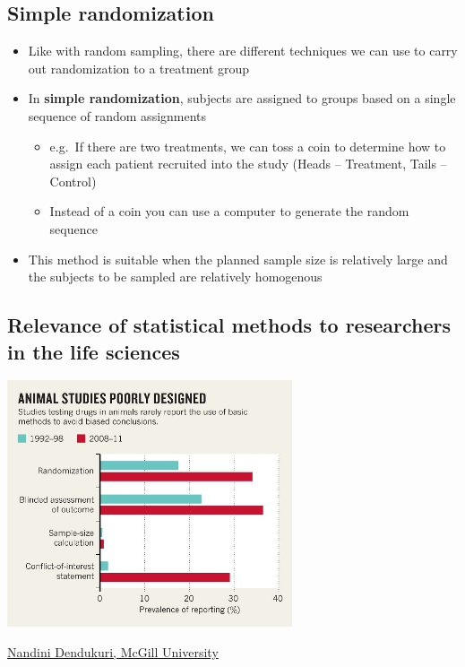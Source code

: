 \documentclass[
]{book}
\providecommand{\tightlist}{%
  \setlength{\itemsep}{0pt}\setlength{\parskip}{0pt}}
\begin{document}
\hypertarget{simple-randomization}{%
\subsection{Simple randomization}\label{simple-randomization}}

\begin{itemize}
\tightlist
\item
  Like with random sampling, there are different techniques we can use to carry out randomization to a treatment group
\item
  In \textbf{simple randomization}, subjects are assigned to groups based on a single sequence of random assignments

  \begin{itemize}
  \tightlist
  \item
    e.g.~If there are two treatments, we can toss a coin to determine how to assign each patient recruited into the study (Heads -- Treatment, Tails -- Control)
  \item
    Instead of a coin you can use a computer to generate the random sequence
  \end{itemize}
\item
  This method is suitable when the planned sample size is relatively large and the subjects to be sampled are relatively homogenous
\end{itemize}

\hypertarget{relevance-of-statistical-methods-to-researchers-in-the-life-sciences}{%
\subsection{Relevance of statistical methods to researchers in the life sciences}\label{relevance-of-statistical-methods-to-researchers-in-the-life-sciences}}

\includegraphics[width=0.5\linewidth]{./1_53}

\href{https://www.nature.com/news/poorly-designed-animal-experiments-in-the-spotlight-1.18559}{Nandini Dendukuri, McGill University}
\end{document}
